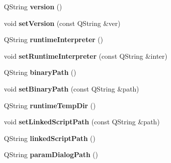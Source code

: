\begin{DoxyCompactItemize}
\item 
Q\+String {\bfseries version} ()\hypertarget{classprim_1_1SimEngine_a47d441637f825e53493a9ee3d77d5a34}{}\label{classprim_1_1SimEngine_a47d441637f825e53493a9ee3d77d5a34}

\item 
void {\bfseries set\+Version} (const Q\+String \&ver)\hypertarget{classprim_1_1SimEngine_ac6bf9eb4fbeb81e8d91615019416288a}{}\label{classprim_1_1SimEngine_ac6bf9eb4fbeb81e8d91615019416288a}

\item 
Q\+String {\bfseries runtime\+Interpreter} ()\hypertarget{classprim_1_1SimEngine_a8288b08d11107527f1e871378e505e17}{}\label{classprim_1_1SimEngine_a8288b08d11107527f1e871378e505e17}

\item 
void {\bfseries set\+Runtime\+Interpreter} (const Q\+String \&inter)\hypertarget{classprim_1_1SimEngine_a73b6ede9762dd94a9e02891457e64ab0}{}\label{classprim_1_1SimEngine_a73b6ede9762dd94a9e02891457e64ab0}

\item 
Q\+String {\bfseries binary\+Path} ()\hypertarget{classprim_1_1SimEngine_a0887989ecd737f29fdd1628f52181504}{}\label{classprim_1_1SimEngine_a0887989ecd737f29fdd1628f52181504}

\item 
void {\bfseries set\+Binary\+Path} (const Q\+String \&path)\hypertarget{classprim_1_1SimEngine_af0b69da547df9a97a02d48c74b61ade6}{}\label{classprim_1_1SimEngine_af0b69da547df9a97a02d48c74b61ade6}

\item 
Q\+String {\bfseries runtime\+Temp\+Dir} ()\hypertarget{classprim_1_1SimEngine_ac17755642b5eb4c5b285d087da7e1375}{}\label{classprim_1_1SimEngine_ac17755642b5eb4c5b285d087da7e1375}

\item 
void {\bfseries set\+Linked\+Script\+Path} (const Q\+String \&path)\hypertarget{classprim_1_1SimEngine_aad8920f3079489198486d7c5847f6348}{}\label{classprim_1_1SimEngine_aad8920f3079489198486d7c5847f6348}

\item 
Q\+String {\bfseries linked\+Script\+Path} ()\hypertarget{classprim_1_1SimEngine_a922509b41d0ba666ce6adf45cd28e965}{}\label{classprim_1_1SimEngine_a922509b41d0ba666ce6adf45cd28e965}

\item 
Q\+String {\bfseries param\+Dialog\+Path} ()\hypertarget{classprim_1_1SimEngine_a9ccf8fe35fe6170fe98aa39b940b39d3}{}\label{classprim_1_1SimEngine_a9ccf8fe35fe6170fe98aa39b940b39d3}


\end{DoxyCompactItemize}
